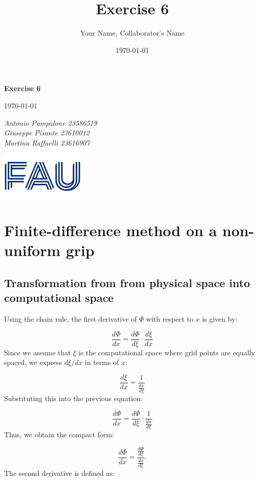 \documentclass{article}
\title{Exercise 6}
\author{Your Name, Collaborator's Name}
\date{\today}
\begin{document}
\begin{titlepage}
    \centering
    \vspace*{1in}
    
    {\Huge\bfseries Exercise 6\par}
    \vspace{1.5cm}
    {\Large \today\par}
    \vspace{1.5cm}
    {\Large\itshape Antonio Pampalone 23586519 \\ Giuseppe Pisante 23610012\\ Martina Raffaelli 23616907 \par}
    
    \vfill
    \includegraphics[width=0.3\textwidth]{FAU-Logo.png}\par\vspace{1cm} %
   
\end{titlepage}

\newpage
\small

\section{Finite-difference method on a non-uniform grip}

\subsection{Transformation from from physical space into computational space}
Using the chain rule, the first derivative of \(\Phi\) with respect to \(x\) is given by:

\[
\frac{d\Phi}{dx} = \frac{d\Phi}{d\xi} \cdot \frac{d\xi}{dx}
\]
Since we assume that \(\xi\) is the computational space where grid points are equally spaced, we express \( d\xi/dx \) in terms of \( x \):

\[
\frac{d\xi}{dx} = \frac{1}{\frac{dx}{d\xi}}
\]
Substituting this into the previous equation:

\[
\frac{d\Phi}{dx} = \frac{d\Phi}{d\xi} \cdot \frac{1}{\frac{dx}{d\xi}}
\]
Thus, we obtain the compact form:

\begin{equation}
\frac{d\Phi}{dx} = \frac{\frac{d\Phi}{d\xi}}{\frac{dx}{d\xi}}.
\end{equation}
The second derivative is defined as:
\end{document}
